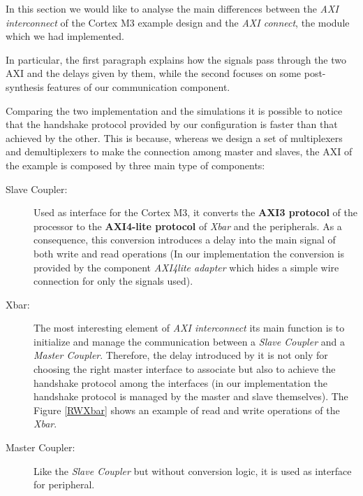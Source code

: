 In this section we would like to analyse the main differences between the \textit{AXI interconnect} of the Cortex M3 example design and the \textit{AXI connect}, the module which we had implemented.
\newline

In particular, the first paragraph explains how the signals pass through the two AXI and the delays given by them, while the second focuses on some post-synthesis features of our communication component.
\newline

{}

Comparing the two implementation and the simulations it is possible to notice that the handshake protocol provided by our configuration is faster than that achieved by the other.
\newline
This is because, whereas we design a set of multiplexers and demultiplexers to make the connection among master and slaves, the AXI of the example is composed by three main type of components:

{\flushleft
\begin{description}

\item[Slave Coupler:]Used as interface for the Cortex M3, it converts the \textbf{AXI3 protocol} of the processor to the \textbf{AXI4-lite protocol} of \textit{Xbar} and the peripherals. As a consequence, this conversion introduces a delay into the main signal of both write and read operations (In our implementation the conversion is provided by the component \textit{AXI4lite adapter} which hides a simple wire connection for only the signals used).

\item[Xbar:]The most interesting element of \textit{AXI interconnect} its main function is to initialize and manage the communication between a \textit{Slave Coupler} and a \textit{Master Coupler}. Therefore, the delay introduced by it is not only for choosing the right master interface to associate but also to achieve the handshake protocol among the interfaces (in our implementation the handshake protocol is managed by the master and slave themselves).
The Figure \ref{RWXbar} shows an example of read and write operations of the \textit{Xbar}.

\item[Master Coupler:]Like the \textit{Slave Coupler} but without conversion logic, it is used as interface for peripheral.

\end{description}
}

